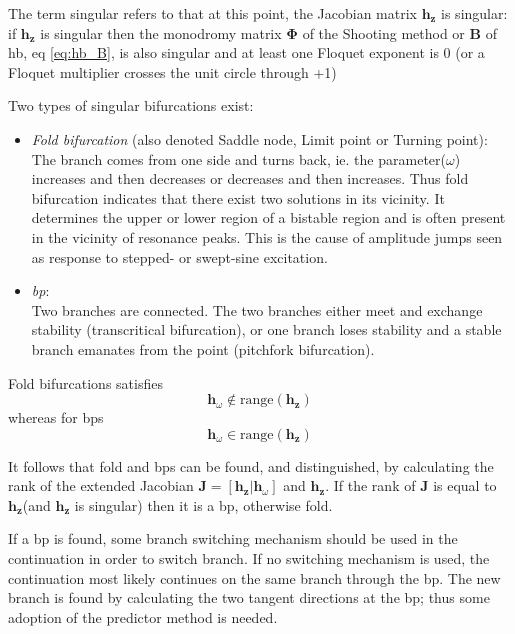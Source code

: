 The term singular refers to that at this point, the Jacobian matrix $\bm h_{\bm
  z}$ is singular: if $\bm h_{\bm z}$ is singular then the monodromy matrix $\bm
\Phi$ of the Shooting method or $\bm B$ of \gls{hb}, eq \eqref{eq:hb_B}, is also
singular and at least one Floquet exponent is 0 (or a Floquet multiplier crosses
the unit circle through +1)

Two types of singular bifurcations exist:

\begin{itemize}
\item \textit{Fold bifurcation} (also denoted Saddle node, Limit point or Turning
  point):\\
  The branch comes from one side and turns back, ie. the parameter($\omega$)
  increases and then decreases or decreases and then increases. Thus fold
  bifurcation indicates that there exist two solutions in its vicinity.
  It determines the upper or lower region of a bistable region and is often
  present in the vicinity of resonance peaks. This is the cause of amplitude
  jumps seen as response to stepped- or swept-sine excitation.
\item \textit{\gls{bp}}: \\
  Two branches are connected. The two branches either meet and exchange
  stability (transcritical bifurcation), or one branch loses stability and a
  stable branch emanates from the point (pitchfork bifurcation).
\end{itemize}

Fold bifurcations satisfies
\begin{equation}
  \bm h_\omega \notin \text{range} (\bm h_{\bm z})
\end{equation}
whereas for \glspl{bp}
\begin{equation}
  \bm h_\omega \in \text{range} (\bm h_{\bm z})
\end{equation}

It follows that fold and \glspl{bp} can be found, and distinguished, by
calculating the rank of the extended Jacobian $\bm J = [\bm h_{\bm z}|\bm
h_\omega]$ and $\bm h_{\bm z}$. If the rank of $\bm J$ is equal to $\bm h_{\bm
  z}$(and $\bm h_{\bm z}$ is singular) then it is a \gls{bp}, otherwise fold.

If a \gls{bp} is found, some branch switching mechanism should be used in the
continuation in order to switch branch. If no switching mechanism is used, the
continuation most likely continues on the same branch through the \gls{bp}. The
new branch is found by calculating the two tangent directions at the \gls{bp};
thus some adoption of the predictor method is needed.



